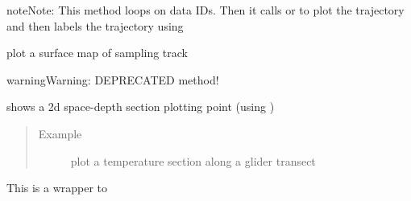 \documentclass[letterpaper,10pt,english]{sphinxmanual}
\begin{document}
\begin{fulllineitems}
\begin{fulllineitems}
\begin{notice}{note}{Note:}
This method loops on data IDs. Then it calls  or  to plot the trajectory and then labels the trajectory using 
\end{notice}

\end{fulllineitems}


\begin{fulllineitems}
\label{altimetry.data:altimetry.data.hydro_data.plot_track_old}
plot a surface map of sampling track

\begin{notice}{warning}{Warning:}
DEPRECATED method!
\end{notice}

\end{fulllineitems}


\begin{fulllineitems}
\label{altimetry.data:altimetry.data.hydro_data.plot_transect}
shows a 2d space-depth section plotting point (using )
\begin{quote}\begin{description}
\item[{Example }] \leavevmode
plot a temperature section along a glider transect

\end{description}\end{quote}

\end{fulllineitems}


\begin{fulllineitems}
\label{altimetry.data:altimetry.data.hydro_data.pop}
This is a wrapper to {\hyperref[altimetry.data:altimetry.data.hydro_data.delete_Variable]{}}


\end{fulllineitems}
\end{fulllineitems}
\end{document}
